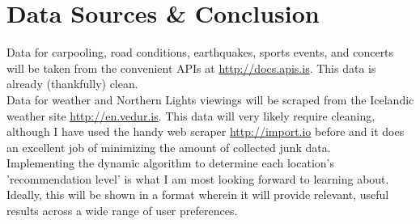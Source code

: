 \documentclass[9pt]{article}
\begin{document}
\section{Data Sources \& Conclusion}

Data for carpooling, road conditions, earthquakes, sports events, and concerts will be taken from the convenient APIs at \url{http://docs.apis.is}. This data is already (thankfully) clean.\\

\noindent{}Data for weather and Northern Lights viewings will be scraped from the Icelandic weather site \url{http://en.vedur.is}. This data will very likely require cleaning, although I have used the handy web scraper \url{http://import.io} before and it does an excellent job of minimizing the amount of collected junk data.\\

Implementing the dynamic algorithm to determine each location's 'recommendation level' is what I am most looking forward to learning about. Ideally, this will be shown in a format wherein it will provide relevant, useful results across a wide range of user preferences.
\end{document}
